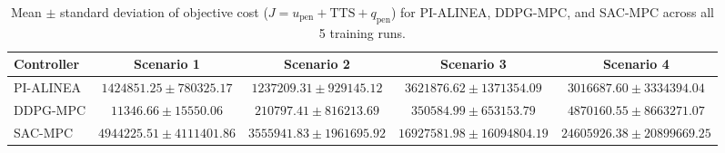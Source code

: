 \begin{table}[htbp]
\centering
\caption{Mean $\pm$ standard deviation of objective cost ($J = u_{\mathrm{pen}} + \mathrm{TTS} + q_{\mathrm{pen}}$) for PI-ALINEA, DDPG-MPC, and SAC-MPC across all 5 training runs.}
\label{tab:obj_multi}
\begin{tabular}{lcccc}
\toprule
Controller & Scenario 1 & Scenario 2 & Scenario 3 & Scenario 4 \\
\midrule
PI-ALINEA & $1424851.25 \pm 780325.17$ & $1237209.31 \pm 929145.12$ & $3621876.62 \pm 1371354.09$ & $3016687.60 \pm 3334394.04$ \\
DDPG-MPC & $11346.66 \pm 15550.06$ & $210797.41 \pm 816213.69$ & $350584.99 \pm 653153.79$ & $4870160.55 \pm 8663271.07$ \\
SAC-MPC & $4944225.51 \pm 4111401.86$ & $3555941.83 \pm 1961695.92$ & $16927581.98 \pm 16094804.19$ & $24605926.38 \pm 20899669.25$ \\
\bottomrule
\end{tabular}
\end{table}
